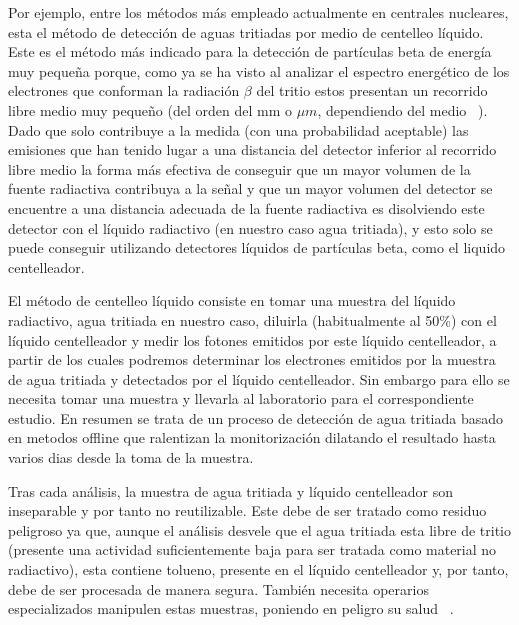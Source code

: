 
Por ejemplo, entre los métodos más empleado actualmente en centrales nucleares, esta el método de detección de aguas tritiadas por medio de centelleo líquido. Este es el método más indicado para la detección de partículas beta de energía muy pequeña porque, como ya se ha visto al analizar el espectro energético de los electrones que conforman la radiación $\beta$ del tritio estos presentan un recorrido libre medio muy pequeño (del orden del mm o $\mu m$, dependiendo del medio ~\cite{Isotopos}). Dado que solo contribuye a la medida (con una probabilidad aceptable) las emisiones que han tenido lugar a una distancia del detector inferior al recorrido libre medio la forma más efectiva de conseguir que un mayor volumen de la fuente radiactiva contribuya a la señal y que un mayor volumen del detector se encuentre a una distancia adecuada de la fuente radiactiva es disolviendo este detector con el líquido radiactivo (en nuestro caso agua tritiada), y esto solo se puede conseguir utilizando detectores líquidos de partículas beta, como el liquido centelleador. 

El método de centelleo líquido consiste en tomar una muestra del líquido radiactivo, agua tritiada en nuestro caso, diluirla (habitualmente al 50\%) con el líquido centelleador y medir los fotones emitidos por este líquido centelleador, a partir de los cuales podremos determinar los electrones emitidos por la muestra de agua tritiada y detectados por el líquido centelleador. Sin embargo para ello se necesita tomar una muestra y llevarla al laboratorio para el correspondiente estudio. En resumen se trata de un proceso de detección de agua tritiada basado en metodos offline que ralentizan la monitorización dilatando el resultado hasta varios dias desde la toma de la muestra. 

Tras cada análisis, la muestra de agua tritiada y líquido centelleador son inseparable y por tanto no reutilizable.  Este debe de ser tratado como residuo peligroso ya que, aunque el análisis desvele que el agua tritiada esta libre de tritio (presente una actividad suficientemente baja para ser tratada como material no radiactivo), esta contiene tolueno, presente en el líquido centelleador y, por tanto, debe de ser procesada de manera segura. También necesita operarios especializados manipulen estas muestras, poniendo en peligro su salud ~\cite{gel}.

